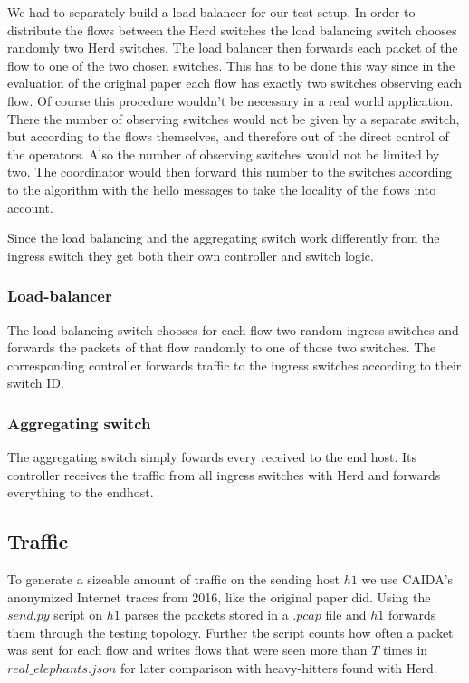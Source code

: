 \documentclass[11pt,oneside,a4paper]{article}
\begin{document}
We had to separately build a load balancer for our test setup. In order to distribute the flows between the Herd switches the load balancing switch chooses randomly two Herd switches. The load balancer then forwards each packet of the flow to one of the two chosen switches. This has to be done this way since in the evaluation of the original paper each flow has exactly two switches observing each flow. Of course this procedure wouldn't be necessary in a real world application. There the number of observing switches would not be given by a separate switch, but according to the flows themselves, and therefore out of the direct control of the operators. Also the number of observing switches would not be limited by two. The coordinator would then forward this number to the switches according to the algorithm with the hello messages to take the locality of the flows into account.

Since the load balancing and the aggregating switch work differently from the ingress switch they get both their own controller and switch logic.

\subsubsection{Load-balancer}
The load-balancing switch chooses for each flow two random ingress switches and forwards the packets of that flow randomly to one of those two switches.
The corresponding controller forwards traffic to the ingress switches according to their switch ID.

\subsubsection{Aggregating switch}
The aggregating switch simply fowards every received to the end host.
Its controller receives the traffic from all ingress switches with Herd and forwards everything to the endhost.

\subsection{Traffic} \label{traffic}
To generate a sizeable amount of traffic on the sending host $h1$ we use CAIDA's anonymized Internet traces from 2016, like the original paper did. Using the $send.py$ script on $h1$ parses the packets stored in a $.pcap$ file and $h1$ forwards them through the testing topology. Further the script counts how often a packet was sent for each flow and writes flows that were seen more than $T$ times in $real\_elephants.json$ for later comparison with heavy-hitters found with Herd.
\end{document}
